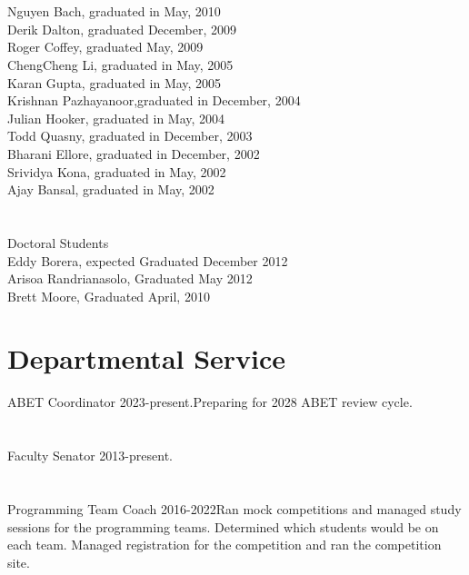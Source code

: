 \documentclass[12pt,letter]{resume}
\begin{document}
        
  \section{}{}{Nguyen Bach, graduated in  May, 2010\\
  Derik Dalton, graduated December, 2009\\
  Roger Coffey, graduated May, 2009\\
  ChengCheng Li, graduated in May, 2005\\
  Karan Gupta, graduated in May, 2005\\
  Krishnan Pazhayanoor,graduated in December, 2004\\
  Julian Hooker, graduated in May, 2004\\
  Todd Quasny, graduated in December, 2003\\
  Bharani Ellore, graduated in December, 2002\\
  Srividya Kona, graduated in May, 2002\\
  Ajay Bansal, graduated in May, 2002\\
}

\section{}{Doctoral Students}
{
  \\Eddy Borera, expected Graduated December 2012\\
  Arisoa Randrianasolo, Graduated May 2012\\
  Brett Moore, Graduated April, 2010\\
 }


\section{Departmental Service}{ABET Coordinator 2023-present.}{Preparing for 2028 ABET review cycle.}

\vspace*{-1.25\baselineskip}
\section{}{Faculty Senator 2013-present.}{}

\vspace*{-1.25\baselineskip}
\section{}{Programming Team Coach 2016-2022}{Ran mock competitions and managed study sessions for the programming teams. Determined which students would be on each team.  Managed registration for the competition and ran the competition site.}
\end{document}
